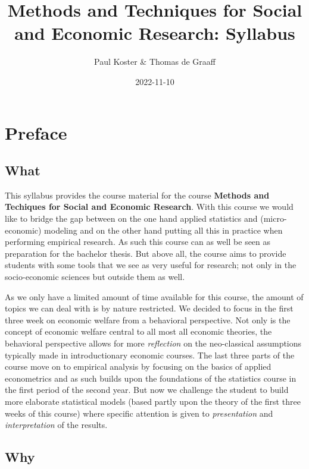\documentclass[
]{book}
\title{Methods and Techniques for Social and Economic Research: Syllabus}
\author{Paul Koster \& Thomas de Graaff}
\date{2022-11-10}
\begin{document}
\maketitle

{
\setcounter{tocdepth}{1}
\tableofcontents
}
\hypertarget{preface}{%
\chapter*{Preface}\label{preface}}

\hypertarget{what}{%
\section*{What}\label{what}}

This syllabus provides the course material for the course \textbf{Methods and Techiques for Social and Economic Research}. With this course we would like to bridge the gap between on the one hand applied statistics and (micro-economic) modeling and on the other hand putting all this in practice when performing empirical research. As such this course can as well be seen as preparation for the bachelor thesis. But above all, the course aims to provide students with some tools that we see as very useful for research; not only in the socio-economic sciences but outside them as well.

As we only have a limited amount of time available for this course, the amount of topics we can deal with is by nature restricted. We decided to focus in the first three week on economic welfare from a behavioral perspective. Not only is the concept of economic welfare central to all most all economic theories, the behavioral perspective allows for more \emph{reflection} on the neo-classical assumptions typically made in introductionary economic courses. The last three parts of the course move on to empirical analysis by focusing on the basics of applied econometrics and as such builds upon the foundations of the statistics course in the first period of the second year. But now we challenge the student to build more elaborate statistical models (based partly upon the theory of the first three weeks of this course) where specific attention is given to \emph{presentation} and \emph{interpretation} of the results.

\hypertarget{why}{%
\section*{Why}\label{why}}
\end{document}
